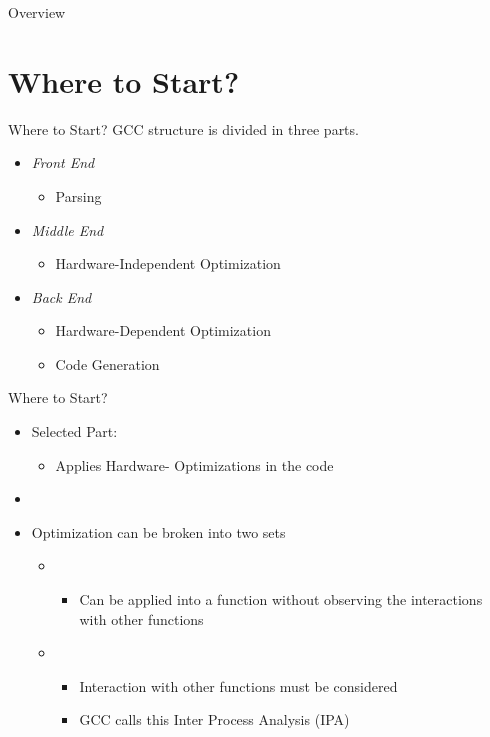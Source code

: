 \begin{frame}{Overview}
  \overview
\end{frame}

\section{Where to Start?}

\begin{frame}{Where to Start?}
  GCC structure is divided in three parts.
  \begin{itemize}
    \item \textit{Front End}
        \begin{itemize}
            \item Parsing
        \end{itemize}
    \item \textit{Middle End}
        \begin{itemize}
            \item Hardware-Independent Optimization
        \end{itemize}
    \item \textit{Back End}
        \begin{itemize}
            \item Hardware-Dependent Optimization
            \item Code Generation
        \end{itemize}
  \end{itemize}
\end{frame}

\begin{frame}{Where to Start?}
  \begin{itemize}
    \item Selected Part: {\color{blue}{Middle End}}
    \begin{itemize}
        \item Applies Hardware-{\color{blue}{Independent}} Optimizations in the code
    \end{itemize}
    \item[]
    \item Optimization can be broken into two {\color{red}{disjoint}} sets
        \begin{itemize}
            \item {\color{blue}{Intra Procedural}}
                \begin{itemize}
                    \item Can be applied into a function without observing the interactions with other functions
                \end{itemize}
            \item {\color{red}{Inter Procedural}}
                \begin{itemize}
                    \item Interaction with other functions must be considered
                    \item GCC calls this Inter Process Analysis (IPA)
                \end{itemize}
        \end{itemize}
  \end{itemize}
\end{frame}

